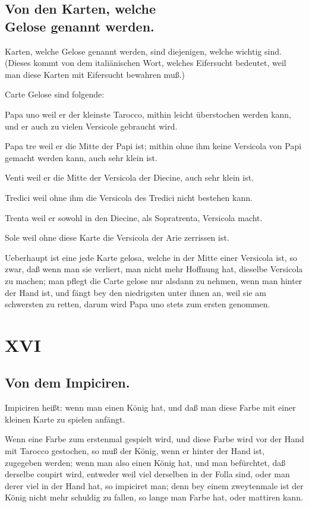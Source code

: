 \documentclass[11pt,a6paper,twoside]{article}
\newenvironment{gelose}
                 {\begin{list}
                     {}
                     {\let\makelabel\textbf
                       \setlength{\labelwidth}{2em}
                       \setlength{\parindent}{0.5em}
                       \setlength{\parsep}{0em}
                       \setlength{\topsep}{0pt}
                       \setlength{\labelsep}{0.5em}
                       \setlength{\itemsep}{2pt}
                       \setlength{\leftmargin}{1.5em}
                       \setlength{\itemindent}{1em} %
                     }
                 }
                 {\end{list}}
\begin{document}
\subsection{Von den Karten, welche \\Gelose genannt werden.}

Karten, welche Gelose genannt werden, sind diejenigen, welche wichtig sind. (Dieses kommt von dem italiänischen Wort, welches Eifersucht bedeutet, weil man diese Karten mit Eifersucht bewahren muß.)

Carte Gelose sind folgende:
\begin{gelose}
\item[Papa uno] weil er der kleinste Tarocco, mithin leicht überstochen werden kann, und er auch zu vielen Versicole gebraucht wird.
\item[Papa tre] weil er die Mitte der Papi ist; mithin ohne ihm keine Versicola von Papi gemacht werden kann, auch sehr klein ist.
\item[Venti] weil er die Mitte der Versicola der Diecine, auch sehr klein ist.
\item[Tredici] weil ohne ihm die Versicola des Tredici nicht bestehen kann.
\item[Trenta] weil er sowohl in den Diecine, als Sopratrenta, Versicola macht.
\item[Sole] weil ohne diese Karte die Versicola der Arie zerrissen ist.
\end{gelose}

Ueberhaupt ist eine jede Karte gelosa, welche in der Mitte einer Versicola ist, so zwar, daß wenn man sie verliert, man nicht mehr Hoffnung hat, dieselbe Versicola zu machen; man pflegt die Carte gelose nur alsdann zu nehmen, wenn man hinter der Hand ist, und fängt bey den niedrigsten unter ihnen an, weil sie am schwersten zu retten, darum wird Papa uno stets zum ersten genommen.

\section{XVI}
\subsection{Von dem Impiciren.}

Impiciren heißt: wenn man einen König hat, und daß man diese Farbe mit einer kleinen Karte zu spielen anfängt.

Wenn eine Farbe zum erstenmal gespielt wird, und diese Farbe wird vor der Hand mit Tarocco gestochen, so muß der König, wenn er hinter der Hand ist, zugegeben werden; wenn man also einen König hat, und man befürchtet, daß derselbe coupirt wird, entweder weil viel derselben in der Folla sind, oder man derer viel in der Hand hat, so impiciret man; denn bey einem zweytenmale ist der König nicht mehr schuldig zu fallen, so lange man Farbe hat, oder mattiren kann.
\end{document}
